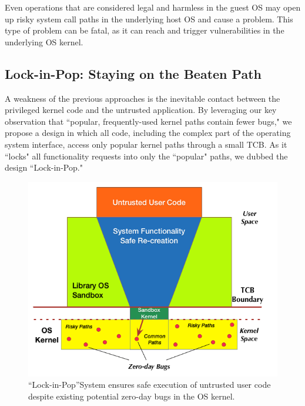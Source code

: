 Even operations that are considered
legal and harmless in the guest OS may open up risky system call paths in the underlying
host OS and cause a problem.
This type of problem can be fatal,
as it can reach and trigger vulnerabilities in the underlying OS kernel.

\subsection{Lock-in-Pop: Staying on the Beaten Path }
A weakness of the previous approaches is the inevitable contact
between the privileged kernel code and the untrusted application.
By leveraging our key observation
that ``popular, frequently-used kernel paths contain fewer bugs," we propose a design
in which all code, including the complex part
of the operating system interface, access only
popular kernel paths through a small TCB. As it ``locks" all functionality
requests into only the ``popular" paths, we dubbed the
design ``Lock-in-Pop."

\begin{figure}%
\centering
\includegraphics[width=.9\columnwidth]{diagram/Virtualization_Design_Model_01.png}
\caption{\small ``Lock-in-Pop''System ensures safe execution of untrusted user code
despite existing potential zero-day bugs in the OS kernel.}
\label{fig:design_safe_reimplementation}
\end{figure}

